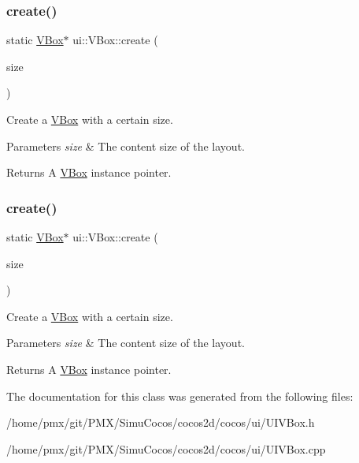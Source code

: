 \subsubsection{\texorpdfstring{create()}{create()}\hspace{0.1cm}{\footnotesize\ttfamily [3/4]}}
{\footnotesize\ttfamily static \hyperlink{classui_1_1VBox}{V\+Box}$\ast$ ui\+::\+V\+Box\+::create (\begin{DoxyParamCaption}\item[{const \hyperlink{classSize}{Size} \&}]{size }\end{DoxyParamCaption})\hspace{0.3cm}{\ttfamily [static]}}

Create a \hyperlink{classui_1_1VBox}{V\+Box} with a certain size. 
\begin{DoxyParams}{Parameters}
{\em size} & The content size of the layout. \\
\hline
\end{DoxyParams}
\begin{DoxyReturn}{Returns}
A \hyperlink{classui_1_1VBox}{V\+Box} instance pointer. 
\end{DoxyReturn}
\mbox{\label{classui_1_1VBox_afa217961ff5274400794dac3c138b43e}} 
\subsubsection{\texorpdfstring{create()}{create()}\hspace{0.1cm}{\footnotesize\ttfamily [4/4]}}
{\footnotesize\ttfamily static \hyperlink{classui_1_1VBox}{V\+Box}$\ast$ ui\+::\+V\+Box\+::create (\begin{DoxyParamCaption}\item[{const \hyperlink{classSize}{Size} \&}]{size }\end{DoxyParamCaption})\hspace{0.3cm}{\ttfamily [static]}}

Create a \hyperlink{classui_1_1VBox}{V\+Box} with a certain size. 
\begin{DoxyParams}{Parameters}
{\em size} & The content size of the layout. \\
\hline
\end{DoxyParams}
\begin{DoxyReturn}{Returns}
A \hyperlink{classui_1_1VBox}{V\+Box} instance pointer. 
\end{DoxyReturn}


The documentation for this class was generated from the following files\+:\begin{DoxyCompactItemize}
\item 
/home/pmx/git/\+P\+M\+X/\+Simu\+Cocos/cocos2d/cocos/ui/U\+I\+V\+Box.\+h\item 
/home/pmx/git/\+P\+M\+X/\+Simu\+Cocos/cocos2d/cocos/ui/U\+I\+V\+Box.\+cpp\end{DoxyCompactItemize}
